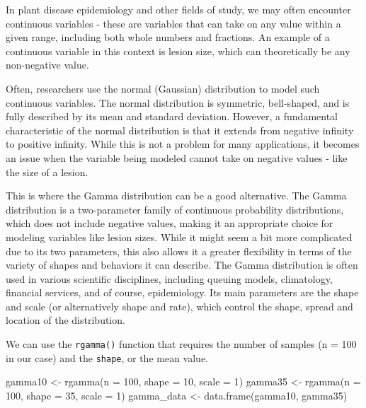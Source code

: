 \documentclass[
  letterpaper,
  DIV=11,
  numbers=noendperiod]{scrreprt}
\newenvironment{Shaded}{\begin{snugshade}}{\end{snugshade}}
\newcommand{\AttributeTok}[1]{\textcolor[rgb]{0.40,0.45,0.13}{#1}}
\newcommand{\DecValTok}[1]{\textcolor[rgb]{0.68,0.00,0.00}{#1}}
\newcommand{\FunctionTok}[1]{\textcolor[rgb]{0.28,0.35,0.67}{#1}}
\newcommand{\NormalTok}[1]{\textcolor[rgb]{0.00,0.23,0.31}{#1}}
\newcommand{\OtherTok}[1]{\textcolor[rgb]{0.00,0.23,0.31}{#1}}
\begin{document}
In plant disease epidemiology and other fields of study, we may often
encounter continuous variables - these are variables that can take on
any value within a given range, including both whole numbers and
fractions. An example of a continuous variable in this context is lesion
size, which can theoretically be any non-negative value.

Often, researchers use the normal (Gaussian) distribution to model such
continuous variables. The normal distribution is symmetric, bell-shaped,
and is fully described by its mean and standard deviation. However, a
fundamental characteristic of the normal distribution is that it extends
from negative infinity to positive infinity. While this is not a problem
for many applications, it becomes an issue when the variable being
modeled cannot take on negative values - like the size of a lesion.

This is where the Gamma distribution can be a good alternative. The
Gamma distribution is a two-parameter family of continuous probability
distributions, which does not include negative values, making it an
appropriate choice for modeling variables like lesion sizes. While it
might seem a bit more complicated due to its two parameters, this also
allows it a greater flexibility in terms of the variety of shapes and
behaviors it can describe. The Gamma distribution is often used in
various scientific disciplines, including queuing models, climatology,
financial services, and of course, epidemiology. Its main parameters are
the shape and scale (or alternatively shape and rate), which control the
shape, spread and location of the distribution.

We can use the \texttt{rgamma()} function that requires the number of
samples (n = 100 in our case) and the \texttt{shape}, or the mean value.

\begin{Shaded}
\begin{Highlighting}[]
\NormalTok{gamma10 }\OtherTok{\textless{}{-}} \FunctionTok{rgamma}\NormalTok{(}\AttributeTok{n =} \DecValTok{100}\NormalTok{, }\AttributeTok{shape =} \DecValTok{10}\NormalTok{, }\AttributeTok{scale =} \DecValTok{1}\NormalTok{)}
\NormalTok{gamma35 }\OtherTok{\textless{}{-}} \FunctionTok{rgamma}\NormalTok{(}\AttributeTok{n =} \DecValTok{100}\NormalTok{, }\AttributeTok{shape =} \DecValTok{35}\NormalTok{, }\AttributeTok{scale =} \DecValTok{1}\NormalTok{)}
\NormalTok{gamma\_data }\OtherTok{\textless{}{-}} \FunctionTok{data.frame}\NormalTok{(gamma10, gamma35)}
\end{Highlighting}
\end{Shaded}
\end{document}
